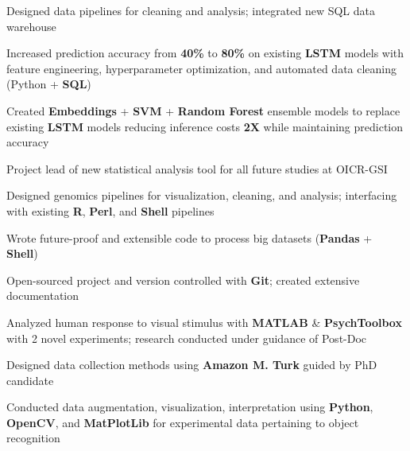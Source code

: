 \documentclass[]{chandan-cv}
\begin{document}
\begin{minipage}[t]{0.75\textwidth}
\begin{tightemize}
        \item Designed data pipelines for cleaning and analysis; integrated new SQL data warehouse
        \item Increased prediction accuracy from \textbf{40\%} to \textbf{80\%} on existing \textbf{LSTM} 
  models with feature engineering, hyperparameter optimization, and automated data cleaning (Python + \textbf{SQL})
        \item Created \textbf{Embeddings} + \textbf{SVM} + \textbf{Random Forest} ensemble models to replace existing 
  \textbf{LSTM} models reducing inference costs \textbf{2X} while maintaining prediction accuracy
\end{tightemize}
\sectionsep

\begin{tightemize}
	\item Project lead of new statistical analysis tool for all future studies at OICR-GSI
	\item Designed genomics pipelines for visualization, cleaning, and analysis; 
	interfacing with existing \textbf{R}, \textbf{Perl}, and \textbf{Shell} pipelines
	\item Wrote future-proof and extensible code to process big datasets (\textbf{Pandas} + \textbf{Shell})
	\item Open-sourced project  and version controlled with \textbf{Git}; created extensive documentation
\end{tightemize}
\sectionsep

\begin{tightemize}
	\item Analyzed human response to visual stimulus with \textbf{MATLAB} \& \textbf{PsychToolbox} with 2 novel experiments; 
	research conducted under guidance of Post-Doc
	\item Designed data collection methods using \textbf{Amazon M. Turk} guided by PhD candidate
	\item Conducted data augmentation, visualization, interpretation using \textbf{Python}, 
	\textbf{OpenCV}, and \textbf{MatPlotLib} for experimental data pertaining to object recognition
\end{tightemize}
\sectionsep


\end{minipage}
\end{document}
